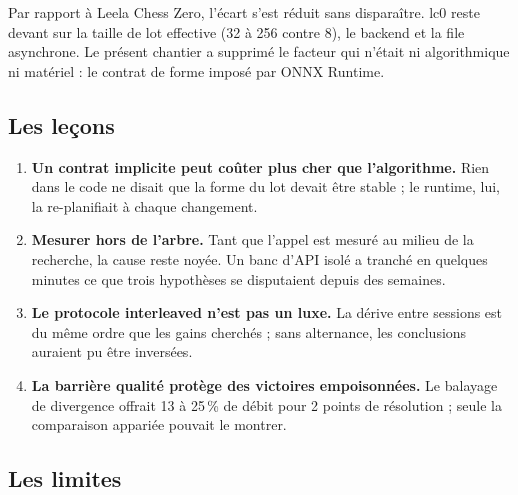 Par rapport \`a Leela Chess Zero, l'\'ecart s'est r\'eduit sans dispara\^itre.
lc0 reste devant sur la taille de lot effective (32 \`a 256 contre 8), le
backend et la file asynchrone. Le pr\'esent chantier a supprim\'e le facteur
qui n'\'etait ni algorithmique ni mat\'eriel : le contrat de forme impos\'e par
ONNX Runtime.

\subsection{Les le\c cons}

\begin{resume}
\begin{enumerate}[leftmargin=1.4em,itemsep=2pt]
  \item \textbf{Un contrat implicite peut co\^uter plus cher que
  l'algorithme.} Rien dans le code ne disait que la forme du lot devait \^etre
  stable ; le runtime, lui, la re-planifiait \`a chaque changement.
  \item \textbf{Mesurer hors de l'arbre.} Tant que l'appel est mesur\'e au
  milieu de la recherche, la cause reste noy\'ee. Un banc d'API isol\'e a
  tranch\'e en quelques minutes ce que trois hypoth\`eses se disputaient
  depuis des semaines.
  \item \textbf{Le protocole interleaved n'est pas un luxe.} La d\'erive entre
  sessions est du m\^eme ordre que les gains cherch\'es ; sans alternance, les
  conclusions auraient pu \^etre invers\'ees.
  \item \textbf{La barri\`ere qualit\'e prot\`ege des victoires empoisonn\'ees.}
  Le balayage de divergence offrait 13 \`a 25\,\% de d\'ebit pour 2 points de
  r\'esolution ; seule la comparaison appari\'ee pouvait le montrer.
\end{enumerate}
\end{resume}

\subsection{Les limites}

